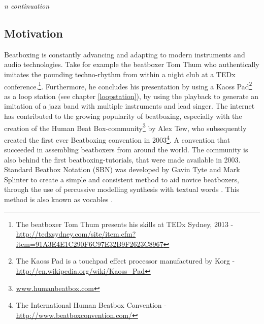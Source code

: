 
\textit{n continuation}

\subsection{ Motivation }
Beatboxing is constantly advancing and adapting to modern instruments and audio technologies. Take for example the beatboxer Tom Thum who authentically imitates the pounding techno-rhythm from within a night club at a TEDx conference.\footnote{The beatboxer Tom Thum presents his skills at TEDx Sydney, 2013 - \url{http://tedxsydney.com/site/item.cfm?item=91A3E4E1C290F6C97E32B9F2623C8967}}. Furthermore, he concludes his presentation by using a Kaoss Pad\footnote{The Kaoss Pad is a touchpad effect processor manufactured by Korg - \url{http://en.wikipedia.org/wiki/Kaoss_Pad}} as a loop station (see chapter \ref{loopstation}), by using the playback to generate an imitation of a jazz band with multiple instruments and lead singer. The internet has contributed to the growing popularity of beatboxing, especially with the creation of the Human Beat Box-community\footnote{\url{www.humanbeatbox.com}} by Alex Tew, who subsequently created the first ever Beatboxing convention in 2003\footnote{The International Human Beatbox Convention - \url{http://www.beatboxconvention.com/}}. A convention that succeeded in assembling beatboxers from around the world. The community is also behind the first beatboxing-tutorials, that were made available in 2003. Standard Beatbox Notation (SBN) was developed by Gavin Tyte and Mark Splinter to create a simple and consistent method to aid novice beatboxers\citep{tyte2005}, through the use of percussive modelling synthesis with textual words \citep{McLean2009}. This method is also known as vocables \citep{McLean2009}.

